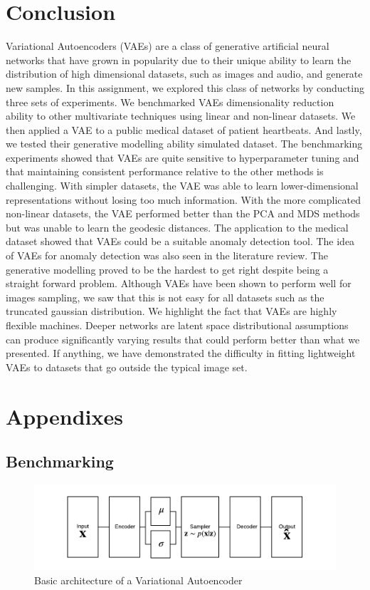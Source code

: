 \documentclass[12pt]{article}
\begin{document}
\newpage
\section{Conclusion}
Variational Autoencoders (VAEs) are a class of generative artificial neural networks that have grown in popularity due to their unique ability to learn the distribution of high dimensional datasets, such as images and audio, and generate new samples. In this assignment, we explored this class of networks by conducting three sets of experiments. We benchmarked VAEs dimensionality reduction ability to other multivariate techniques using linear and non-linear datasets. We then applied a VAE to a public medical dataset of patient heartbeats. And lastly, we tested their generative modelling ability simulated dataset. The benchmarking experiments showed that VAEs are quite sensitive to hyperparameter tuning and that maintaining consistent performance relative to the other methods is challenging. With simpler datasets, the VAE was able to learn lower-dimensional representations without losing too much information. With the more complicated non-linear datasets, the VAE performed better than the PCA and MDS methods but was unable to learn the geodesic distances. The application to the medical dataset showed that VAEs could be a suitable anomaly detection tool. The idea of VAEs for anomaly detection was also seen in the literature review. The generative modelling proved to be the hardest to get right despite being a straight forward problem. Although VAEs have been shown to perform well for images sampling, we saw that this is not easy for all datasets such as the truncated gaussian distribution.  We highlight the fact that VAEs are highly flexible machines. Deeper networks are latent space distributional assumptions can produce significantly varying results that could perform better than what we presented. If anything, we have demonstrated the difficulty in fitting lightweight  VAEs to datasets that go outside the typical image set. 



\newpage
\section{Appendixes}
\subsection{Benchmarking}

\begin{figure}[h]
\includegraphics[width=1\textwidth]{../../media/encoder.png}%
\caption{Basic architecture of a Variational Autoencoder}
\label{fig:Bench1}
\end{figure}
\end{document}
